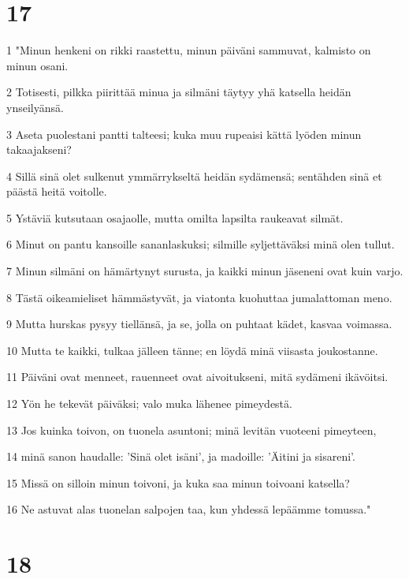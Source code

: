 \chapter{17}

\par 1 "Minun henkeni on rikki raastettu, minun päiväni sammuvat, kalmisto on minun osani.
\par 2 Totisesti, pilkka piirittää minua ja silmäni täytyy yhä katsella heidän ynseilyänsä.
\par 3 Aseta puolestani pantti talteesi; kuka muu rupeaisi kättä lyöden minun takaajakseni?
\par 4 Sillä sinä olet sulkenut ymmärrykseltä heidän sydämensä; sentähden sinä et päästä heitä voitolle.
\par 5 Ystäviä kutsutaan osajaolle, mutta omilta lapsilta raukeavat silmät.
\par 6 Minut on pantu kansoille sananlaskuksi; silmille syljettäväksi minä olen tullut.
\par 7 Minun silmäni on hämärtynyt surusta, ja kaikki minun jäseneni ovat kuin varjo.
\par 8 Tästä oikeamieliset hämmästyvät, ja viatonta kuohuttaa jumalattoman meno.
\par 9 Mutta hurskas pysyy tiellänsä, ja se, jolla on puhtaat kädet, kasvaa voimassa.
\par 10 Mutta te kaikki, tulkaa jälleen tänne; en löydä minä viisasta joukostanne.
\par 11 Päiväni ovat menneet, rauenneet ovat aivoitukseni, mitä sydämeni ikävöitsi.
\par 12 Yön he tekevät päiväksi; valo muka lähenee pimeydestä.
\par 13 Jos kuinka toivon, on tuonela asuntoni; minä levitän vuoteeni pimeyteen,
\par 14 minä sanon haudalle: 'Sinä olet isäni', ja madoille: 'Äitini ja sisareni'.
\par 15 Missä on silloin minun toivoni, ja kuka saa minun toivoani katsella?
\par 16 Ne astuvat alas tuonelan salpojen taa, kun yhdessä lepäämme tomussa."

\chapter{18}

